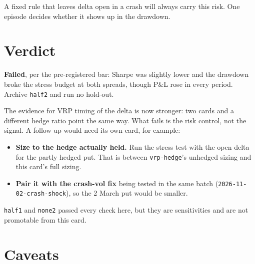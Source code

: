 \documentclass{article}
\begin{document}
A fixed rule that leaves delta open in a crash will always carry this risk. One episode decides whether it shows up in the drawdown.

\section{Verdict}

\textbf{Failed}, per the pre-registered bar: Sharpe was slightly lower and the drawdown broke the stress budget at both spreads, though P\&L rose in every period. Archive \texttt{half2} and run no hold-out.

The evidence for VRP timing of the delta is now stronger: two cards and a different hedge ratio point the same way. What fails is the risk control, not the signal. A follow-up would need its own card, for example:

\begin{itemize}

\item \textbf{Size to the hedge actually held.} Run the stress test with the open delta for the partly hedged put. That is between \texttt{vrp-\allowbreak{}hedge}'s unhedged sizing and this card's full sizing.

\item \textbf{Pair it with the crash-vol fix} being tested in the same batch (\texttt{2026-\allowbreak{}11-\allowbreak{}02-\allowbreak{}crash-\allowbreak{}shock}), so the 2 March put would be smaller.

\end{itemize}

\texttt{half1} and \texttt{none2} passed every check here, but they are sensitivities and are not promotable from this card.

\section{Caveats}
\end{document}
